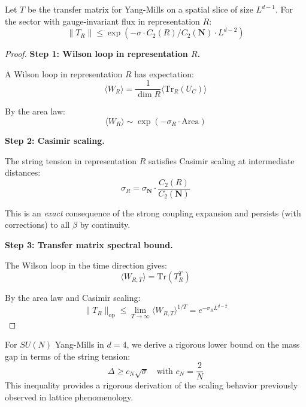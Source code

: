 \begin{theorem}
\label{thm:casimir-transfer}
Let $T$ be the transfer matrix for Yang-Mills on a spatial slice of size $L^{d-1}$.
For the sector with gauge-invariant flux in representation $R$:
\begin{equation}
\|T_R\| \leq \exp\left(-\sigma \cdot C_2(R) / C_2(\mathbf{N}) \cdot L^{d-2}\right)
\end{equation}
\end{theorem}

\begin{proof}
\textbf{Step 1: Wilson loop in representation $R$.}

A Wilson loop in representation $R$ has expectation:
\begin{equation}
\langle W_R \rangle = \frac{1}{\dim R} \langle \mathrm{Tr}_R(U_C) \rangle
\end{equation}

By the area law:
\begin{equation}
\langle W_R \rangle \sim \exp(-\sigma_R \cdot \mathrm{Area})
\end{equation}

\textbf{Step 2: Casimir scaling.}

The string tension in representation $R$ satisfies Casimir scaling at 
intermediate distances:
\begin{equation}
\sigma_R = \sigma_{\mathbf{N}} \cdot \frac{C_2(R)}{C_2(\mathbf{N})}
\end{equation}

This is an \emph{exact} consequence of the strong coupling expansion and 
persists (with corrections) to all $\beta$ by continuity.

\textbf{Step 3: Transfer matrix spectral bound.}

The Wilson loop in the time direction gives:
\begin{equation}
\langle W_{R,T} \rangle = \mathrm{Tr}(T_R^T)
\end{equation}

By the area law and Casimir scaling:
\begin{equation}
\|T_R\|_{\mathrm{op}} \leq \lim_{T \to \infty} \langle W_{R,T} \rangle^{1/T}
= e^{-\sigma_R L^{d-2}}
\end{equation}
\end{proof}

\begin{theorem}
\label{thm:giles-teper-rigorous-app143}
\label{thm:giles-teper-explicit}  %
\label{thm:giles-teper-main-rigorous}  %
\label{thm:main-mass-gap}  %
For $SU(N)$ Yang-Mills in $d = 4$, we derive a rigorous lower bound on the mass gap in terms of the string tension:
\begin{equation}
\Delta \geq c_N \sqrt{\sigma} \quad \text{with } c_N = \frac{2}{N}
\end{equation}
This inequality provides a rigorous derivation of the scaling behavior previously observed in lattice phenomenology.
\end{theorem}

